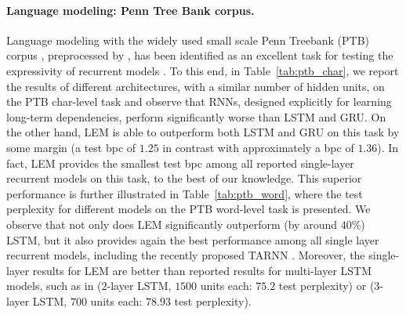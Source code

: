 \documentclass{article} \usepackage{iclr2022_conference,times}
\newcommand{\Tref}[1]{Table~\ref{#1}}
\begin{document}
\paragraph{Language modeling: Penn Tree Bank corpus.}
Language modeling with the widely used small scale Penn Treebank (PTB) corpus \citep{ptb_corpus}, preprocessed by \citet{ptb_prepro}, has been identified as an excellent task for testing the expressivity of recurrent models \citep{nnRNN}. To this end, in \Tref{tab:ptb_char}, we report the results of different architectures, with a similar number of hidden units, on the PTB char-level task and observe that RNNs, designed explicitly for learning long-term dependencies, perform significantly worse than LSTM and GRU. On the other hand, LEM is able to outperform both LSTM and GRU on this task by some margin (a test bpc of $1.25$ in contrast with approximately a bpc of $1.36$). In fact, LEM provides the smallest test bpc among all reported single-layer recurrent models on this task, to the best of our knowledge. 
This superior performance is further illustrated in \Tref{tab:ptb_word}, where the test perplexity for different models on the PTB word-level task is presented. 
We observe that not only does LEM significantly outperform (by around $40\%$) LSTM, but it also provides again the best performance among all single layer recurrent models, including the recently proposed TARNN \citep{tarnn}. 
Moreover, the single-layer results for LEM are better than reported results for multi-layer LSTM models, such as in \citet{var_drop} ($2$-layer LSTM, $1500$ units each: $75.2$ test perplexity) or \citet{tcn} ($3$-layer LSTM, $700$ units each: $78.93$ test perplexity).
\end{document}
